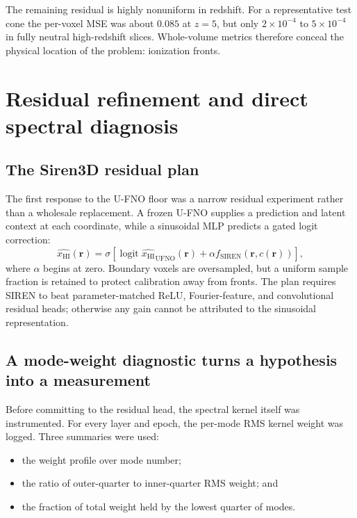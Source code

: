 \documentclass[11pt,a4paper]{article}
\newcommand{\xhi}{x_{\mathrm{HI}}}
\begin{document}
The remaining residual is highly nonuniform in redshift. For a representative
test cone the per-voxel MSE was about \(0.085\) at \(z=5\), but only
\(2\times10^{-4}\) to \(5\times10^{-4}\) in fully neutral high-redshift
slices. Whole-volume metrics therefore conceal the physical location of the
problem: ionization fronts.

\section{Residual refinement and direct spectral diagnosis}

\subsection{The Siren3D residual plan}

The first response to the U-FNO floor was a narrow residual experiment rather
than a wholesale replacement. A frozen U-FNO supplies a prediction and latent
context at each coordinate, while a sinusoidal MLP predicts a gated logit
correction:
\begin{equation}
\widehat{\xhi}(\mathbf{r})
=\sigma\!\left[
\operatorname{logit}\widehat{\xhi}_{\mathrm{UFNO}}(\mathbf{r})
+\alpha f_{\mathrm{SIREN}}(\mathbf{r},c(\mathbf{r}))
\right],
\end{equation}
where \(\alpha\) begins at zero. Boundary voxels are oversampled, but a uniform
sample fraction is retained to protect calibration away from fronts. The plan
requires SIREN to beat parameter-matched ReLU, Fourier-feature, and
convolutional residual heads; otherwise any gain cannot be attributed to the
sinusoidal representation.

\subsection{A mode-weight diagnostic turns a hypothesis into a measurement}

Before committing to the residual head, the spectral kernel itself was
instrumented. For every layer and epoch, the per-mode RMS kernel weight was
logged. Three summaries were used:
\begin{itemize}
  \item the weight profile over mode number;
  \item the ratio of outer-quarter to inner-quarter RMS weight; and
  \item the fraction of total weight held by the lowest quarter of modes.
\end{itemize}
\end{document}
